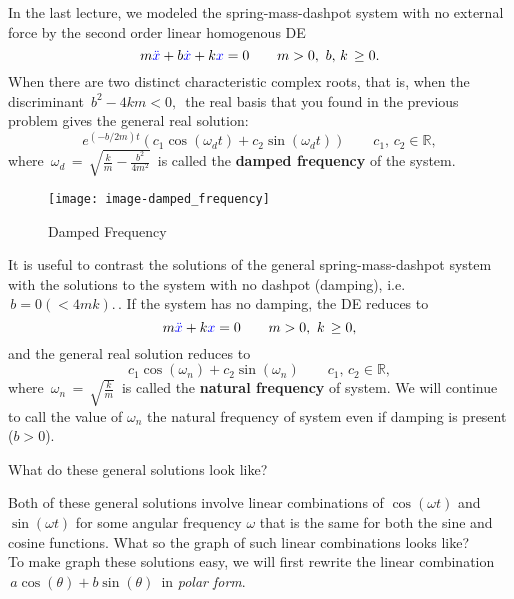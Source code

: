 In the last lecture, we modeled the spring-mass-dashpot system with
no external force by the second order linear homogenous DE
\begin{equation*}
  m {\color{blue}{\ddot{x}}}  + b {\color{blue}{\dot{x}}}  + k{\color{blue}{x}}  =0 \qquad m>0, \, \, b,\, k\, \geq 0.
\end{equation*}
When there are two distinct characteristic complex roots, that is,
when the discriminant $\, b^2-4km<0,\,$
the real basis that you found in the previous problem gives the general real solution:
\begin{equation*}
  \displaystyle  e^{(-b/2m)t} \left( c_1\cos \left(\omega _ d t\right)+c_2 \sin \left(\omega _ d t\right)\right)
  \qquad c_1,\, c_2 \in \mathbb {R},
\end{equation*}
where $\,  \displaystyle \omega _ d\, =\, \sqrt {\frac{k}{m}-\frac{b^2}{4m^2}}\,$
is called the \textbf{{\color{blue} damped frequency}} of the system.
\begin{figure}[ht!]
  \centering
  \texttt{[image: image-damped\_frequency]}
  \caption{Damped Frequency}
\end{figure}
It is useful to contrast the solutions of the general spring-mass-dashpot system with
the solutions to the system with no dashpot (damping), i.e. $\, b=0 (<4mk).\,$.
If the system has no damping, the DE reduces to
\begin{equation*}
  m {\color{blue}{\ddot{x}}}  + k {\color{blue}{x}}  =0\qquad m>0, \, \, k\, \geq 0,
\end{equation*}
and the general real solution reduces to
\begin{equation*}
  \displaystyle  c_1 \cos \left(\omega _ n\right)+c_2\sin \left(\omega _ n\right)
  \qquad c_1,\, c_2 \in \mathbb {R},
\end{equation*}
where $\,  \displaystyle \omega _ n\, =\, \sqrt {\frac{k}{m}}\,$
is called the \textbf{{\color{blue} natural frequency}} of system.
We will continue to call the value of $\omega _ n$ the natural frequency
of system even if damping is present ($b > 0$).
\begin{question}
  What do these general solutions look like? 
\end{question}
Both of these general solutions involve linear combinations of $\cos (\omega t)$ and
$\sin (\omega t)$ for some angular frequency $\omega$ that is the same for both
the sine and cosine functions. What so the graph of such linear combinations looks like?\\
To make graph these solutions easy, we will first rewrite the linear combination
$\, a\cos (\theta )+b\sin (\theta )\,$ in \textit{polar form}.
\clearpage

